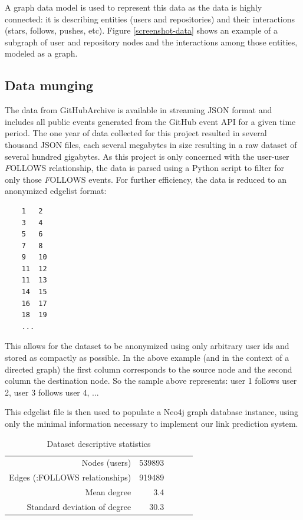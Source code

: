 A graph data model is used to represent this data as the data is highly connected: it is describing entities (users and repositories) and their interactions (stars, follows, pushes, etc). Figure \ref{screenshot-data} shows an example of a subgraph of user and repository nodes and the interactions among those entities, modeled as a graph.

\subsection{Data munging}
The data from GitHubArchive is available in streaming JSON format and includes all public events generated from the GitHub event API \cite{github:Online} for a given time period. The one year of data collected for this project resulted in several thousand JSON files, each several megabytes in size resulting in a raw dataset of several hundred gigabytes. As this project is only concerned with the user-user {\textit FOLLOWS} relationship, the data is parsed using a Python script to filter for only those {\textit FOLLOWS} events. For further efficiency, the data is reduced to an anonymized edgelist format:
\begin{verbatim}
    1	2
    3	4
    5	6
    7	8
    9	10
    11	12
    11	13
    14	15
    16	17
    18	19
    ...
\end{verbatim}
This allows for the dataset to be anonymized using only arbitrary user ids and stored as compactly as possible. In the above example (and in the context of a directed graph) the first column corresponds to the source node and the second column the destination node. So the sample above represents: user 1 follows user 2, user 3 follows user 4, ...

This edgelist file is then used to populate a Neo4j graph database instance, using only the minimal information necessary to implement our link prediction system. 

\begin{table}[t]
\caption{Dataset descriptive statistics}
\label{results}
\vskip 0.15in
\begin{center}
\begin{small}
\begin{sc}
\begin{tabular}{rrccr}
\hline
Nodes (users) & 539893  \\
Edges (:FOLLOWS relationships) & 919489 \\
Mean degree & 3.4 \\
Standard deviation of degree & 30.3 \\
\hline
\end{tabular}
\end{sc}
\end{small}
\end{center}
\vskip -0.1in
\end{table}


